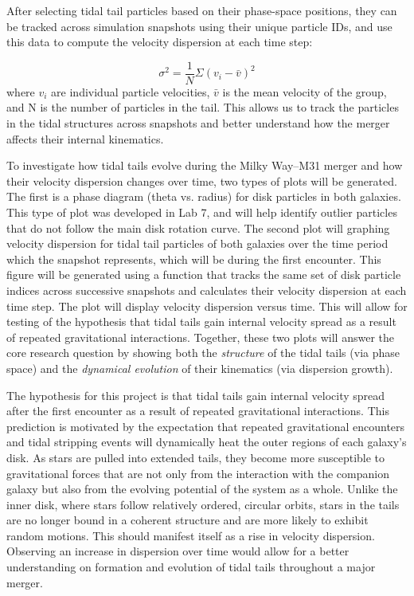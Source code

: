 \documentclass[fleqn,usenatbib]{mnras}
\begin{document}
After selecting tidal tail particles based on their phase-space positions, they can be tracked across simulation snapshots using their unique particle IDs, and use this data to compute the velocity dispersion at each time step:

\begin{equation}
    \sigma^2 = \frac{1}{N} \Sigma(v_i-\bar{v})^2
\end{equation}
where $v_i$ are individual particle velocities, $\bar{v}$ is the mean velocity of the group, and N is the number of particles in the tail. This allows us to track the particles in the tidal structures across snapshots and better understand how the merger affects their internal kinematics.

To investigate how tidal tails evolve during the Milky Way–M31 merger and how their velocity dispersion changes over time, two types of plots will be generated. The first is a phase diagram (theta vs. radius) for disk particles in both galaxies. This type of plot was developed in Lab 7, and will help identify outlier particles that do not follow the main disk rotation curve. The second plot will graphing velocity dispersion for tidal tail particles of both galaxies over the time period which the snapshot represents, which will be during the first encounter. This figure will be generated using a function that tracks the same set of disk particle indices across successive snapshots and calculates their velocity dispersion at each time step. The plot will display velocity dispersion versus time. This will allow for testing of the hypothesis that tidal tails gain internal velocity spread as a result of repeated gravitational interactions. Together, these two plots will answer the core research question by showing both the \textit{structure} of the tidal tails (via phase space) and the \textit{dynamical evolution} of their kinematics (via dispersion growth).

The hypothesis for this project is that tidal tails gain internal velocity spread after the first encounter as a result of repeated gravitational interactions. This prediction is motivated by the expectation that repeated gravitational encounters and tidal stripping events will dynamically heat the outer regions of each galaxy's disk. As stars are pulled into extended tails, they become more susceptible to gravitational forces that are not only from the interaction with the companion galaxy but also from the evolving potential of the system as a whole. Unlike the inner disk, where stars follow relatively ordered, circular orbits, stars in the tails are no longer bound in a coherent structure and are more likely to exhibit random motions. This should manifest itself as a rise in velocity dispersion. Observing an increase in dispersion over time would allow for a better understanding on formation and evolution of tidal tails throughout a major merger. 
\end{document}
